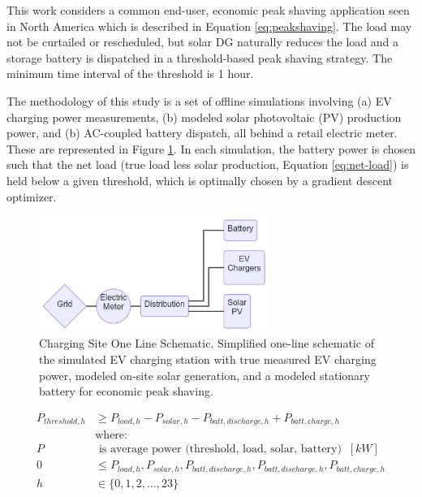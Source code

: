 \documentclass[journal,article,submit,pdftex,moreauthors]{Definitions/mdpi}
\begin{document}
This work considers a common end-user, economic peak shaving application seen in North America which is described in Equation \ref{eq:peakshaving}. The load may not be curtailed or rescheduled, but solar DG naturally reduces the load and a storage battery is dispatched in a threshold-based peak shaving strategy. The minimum time interval of the threshold is 1 hour.

The methodology of this study is a set of offline simulations involving (a) EV charging power measurements, (b) modeled solar photovoltaic (PV) production power, and (b) AC-coupled battery dispatch, all behind a retail electric meter. These are represented in Figure \ref{fig:oneline}. In each simulation, the battery power is chosen such that the net load (true load less solar production, Equation \ref{eq:net-load}) is held below a given threshold, which is optimally chosen by a gradient descent optimizer.


\begin{figure}
  \centering
  \includegraphics[width=7.5cm]{./images/oneline.png}
  \caption{Charging Site One Line Schematic. Simplified one-line schematic of the simulated EV charging station with true measured EV charging power, modeled on-site solar generation, and a modeled stationary battery for economic peak shaving.}
  \label{fig:oneline}
\end{figure}


\begin{equation}
  \label{eq:peakshaving}
  \begin{split}
    P_{threshold,h} & \ge P_{load,h} - P_{solar,h} - P_{batt,discharge,h} + P_{batt,charge,h}                     \\
                    & \text{where:}                                                                               \\
    P               & \text{ is average power (threshold, load, solar, battery) }\ [kW]                           \\
    0               & \le  P_{load,h}, P_{solar,h}, P_{batt,discharge,h}, P_{batt,discharge,h}, P_{batt,charge,h} \\
    h               & \in \{0,1,2,...,23\}                                                                        \\
  \end{split}
\end{equation}
\end{document}
